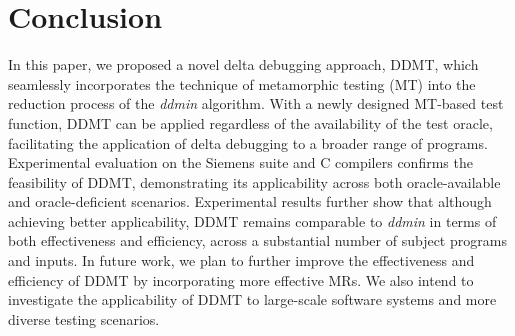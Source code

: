 \section{Conclusion}
\label{sec:con}

In this paper, we proposed a novel delta debugging approach, DDMT, which seamlessly incorporates the technique of metamorphic testing (MT) into the reduction process of the \emph{ddmin} algorithm. 
With a newly designed MT-based test function, DDMT can be applied regardless of the availability of the test oracle, facilitating the application of delta debugging to a broader range of programs.
Experimental evaluation on the Siemens suite and C compilers confirms the feasibility of DDMT, demonstrating its applicability across both oracle-available and oracle-deficient scenarios.
Experimental results further show that although achieving better applicability, DDMT remains comparable to \emph{ddmin} in terms of both effectiveness and efficiency,  across a substantial number of subject programs and inputs.
In future work, we plan to further improve the effectiveness and efficiency of DDMT by incorporating more effective MRs.
We also intend to investigate the applicability of DDMT to large-scale software systems and more diverse testing scenarios.







